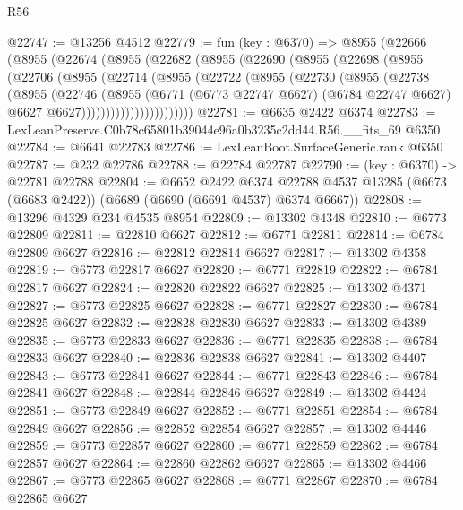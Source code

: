 \begin{lexlean}{R56}
\begin{coremodule}
@22747 := @13256 @4512
@22779 := fun (key : @6370) =>
  @8955
    (@22666
      (@8955
        (@22674
          (@8955
            (@22682
              (@8955
                (@22690
                  (@8955
                    (@22698
                      (@8955
                        (@22706
                          (@8955
                            (@22714
                              (@8955
                                (@22722
                                  (@8955
                                    (@22730
                                      (@8955
                                        (@22738
                                          (@8955
                                            (@22746
                                              (@8955
                                                (@6771
                                                  (@6773 @22747 @6627)
                                                  (@6784 @22747 @6627)
                                                  @6627
                                                  @6627)))))))))))))))))))))))
@22781 := @6635 @2422 @6374
@22783 := LexLeanPreserve.C0b78c65801b39044e96a0b3235c2dd44.R56.__fits_69 @6350
@22784 := @6641 @22783
@22786 := LexLeanBoot.SurfaceGeneric.rank @6350
@22787 := @232 @22786
@22788 := @22784 @22787
@22790 := (key : @6370) -> @22781 @22788
@22804 := @6652
    @2422
    @6374
    @22788
    @4537
    @13285
    (@6673 (@6683 @2422))
    (@6689 (@6690 (@6691 @4537) @6374 @6667))
@22808 := @13296 @4329 @234 @4535 @8954
@22809 := @13302 @4348
@22810 := @6773 @22809
@22811 := @22810 @6627
@22812 := @6771 @22811
@22814 := @6784 @22809 @6627
@22816 := @22812 @22814 @6627
@22817 := @13302 @4358
@22819 := @6773 @22817 @6627
@22820 := @6771 @22819
@22822 := @6784 @22817 @6627
@22824 := @22820 @22822 @6627
@22825 := @13302 @4371
@22827 := @6773 @22825 @6627
@22828 := @6771 @22827
@22830 := @6784 @22825 @6627
@22832 := @22828 @22830 @6627
@22833 := @13302 @4389
@22835 := @6773 @22833 @6627
@22836 := @6771 @22835
@22838 := @6784 @22833 @6627
@22840 := @22836 @22838 @6627
@22841 := @13302 @4407
@22843 := @6773 @22841 @6627
@22844 := @6771 @22843
@22846 := @6784 @22841 @6627
@22848 := @22844 @22846 @6627
@22849 := @13302 @4424
@22851 := @6773 @22849 @6627
@22852 := @6771 @22851
@22854 := @6784 @22849 @6627
@22856 := @22852 @22854 @6627
@22857 := @13302 @4446
@22859 := @6773 @22857 @6627
@22860 := @6771 @22859
@22862 := @6784 @22857 @6627
@22864 := @22860 @22862 @6627
@22865 := @13302 @4466
@22867 := @6773 @22865 @6627
@22868 := @6771 @22867
@22870 := @6784 @22865 @6627

\end{coremodule}
\end{lexlean}
